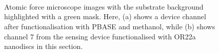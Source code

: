 \documentclass[
  a4paper,
]{scrbook}
\begin{document}
\begin{figure}
\begin{minipage}[t]{0.01\linewidth}
{~

}

\end{minipage}%
%
\begin{minipage}[t]{0.03\linewidth}

{\centering 


}

\end{minipage}%
%
\begin{minipage}[t]{0.01\linewidth}

{\centering 

~

}

\end{minipage}%
%
\begin{minipage}[t]{0.45\linewidth}

{\centering 


}

\end{minipage}%
%
\begin{minipage}[t]{0.01\linewidth}

{\centering 

~

}

\end{minipage}%

\caption{\label{fig-working-OR22a-masks}Atomic force microscope images
with the substrate background highlighted with a green mask. Here, (a)
shows a device channel after functionalisation with PBASE and methanol,
while (b) shows channel 7 from the sensing device functionalised with
OR22a nanodiscs in this section.}

\end{figure}
\end{document}

